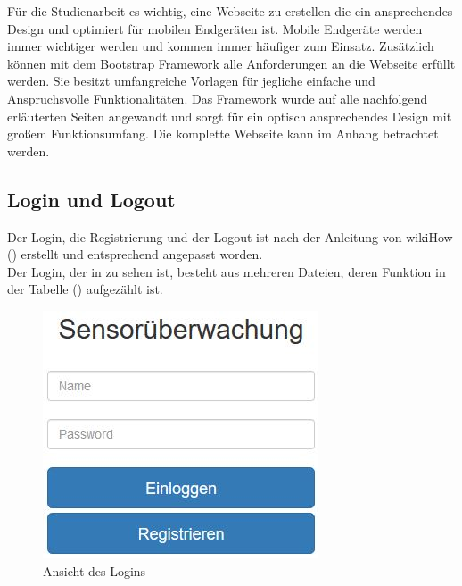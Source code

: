 Für die Studienarbeit es wichtig, eine Webseite zu erstellen die ein ansprechendes Design und optimiert für mobilen Endgeräten ist. Mobile Endgeräte werden immer wichtiger werden und kommen immer häufiger zum Einsatz. Zusätzlich können mit dem Bootstrap Framework alle Anforderungen an die Webseite erfüllt werden. Sie besitzt umfangreiche Vorlagen für jegliche einfache und Anspruchsvolle Funktionalitäten. Das Framework wurde auf alle nachfolgend erläuterten Seiten angewandt und sorgt für ein optisch ansprechendes Design mit großem Funktionsumfang. Die komplette Webseite kann im Anhang betrachtet werden. 
\subsection{Login und Logout}\label{login}

Der Login, die Registrierung und der Logout ist nach der Anleitung von
wikiHow (\cite{PHP-Login:online}) erstellt und entsprechend angepasst worden. 
\\
Der Login, der in  zu sehen ist, besteht aus mehreren Dateien, deren Funktion in der Tabelle
() aufgezählt ist.

\begin{figure} [htb]
\begin{centering}
\includegraphics{Bilder/Kapitel4/login.jpg}
\caption[Ansicht des Logins]{Ansicht des Logins}
\label{pic:login}
\end{centering}
\end{figure}

